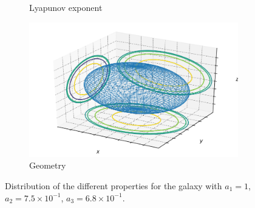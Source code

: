 \begin{figure}[h]
\begin{subfigure}[t]{0.4\textwidth}
        \caption{Lyapunov exponent}
    \end{subfigure}
    \begin{subfigure}[t]{0.4\textwidth}
        \includegraphics[width=\textwidth]{"../Files/Week 13/images/13_ellipsoid"}
        \caption{Geometry}
    \end{subfigure}
    \caption{Distribution of the different properties for the galaxy with $a_1 = 1$, $a_2 = 7.5\times10^{-1}$, $a_3 = 6.8\times10^{-1}$.}
\end{figure}


